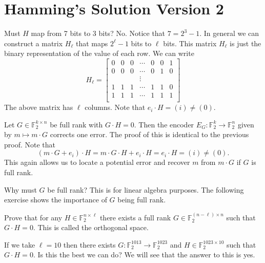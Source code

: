 \documentclass[10pt]{article}
\begin{document}
\section{Hamming's Solution Version 2}
Must $H$ map from 7 bits to 3 bits? No. Notice that $7 = 2^3-1.$ In general we can construct a matrix $H_\ell$ that maps $2^{\ell}-1$ bits to $\ell$ bits. This matrix $H_\ell$ is just the binary representation of the value of each row. We can write
\begin{equation}
H_\ell = \left[\begin{array}{ccccccc}
0 & 0 & 0  & \cdots & 0 & 0 & 1 \\
0 & 0 & 0 & \cdots & 0 & 1 & 0 \\
&&&\vdots&&& \\
1 & 1 & 1 & \cdots & 1 & 1 & 0 \\
1 & 1 & 1 & \cdots & 1 & 1 & 1 \\
\end{array}\right]
\end{equation}
The above matrix has $\ell$ columns. Note that $e_i \cdot H = (i) \neq (0).$ 

Let $G \in \mathbb F_2^{k \times n}$ be full rank with $G \cdot H = 0$. Then the encoder $E_G: \mathbb F_2^k \rightarrow \mathbb F_2^n$ given by $m \mapsto m\cdot G$ corrects one error. The proof of this is identical to the previous proof. Note that $$(m\cdot G + e_i) \cdot H = m\cdot G \cdot H + e_i \cdot H = e_i \cdot H = (i) \neq (0).$$ This again allows us to locate a potential error and recover $m$ from $m \cdot G$ if $G$ is full rank.

Why must $G$ be full rank? This is for linear algebra purposes. The following exercise shows the importance of $G$ being full rank.
\begin{exercise}
Prove that for any $H \in \mathbb F_2^{n \times \ell}$ there exists a full rank $G \in \mathbb F_2^{(n-\ell)\times n}$ such that $G \cdot H = 0$. This is called the orthogonal space.
\end{exercise}

If we take $\ell = 10$ then there exists $G: \mathbb F_2^{1013} \rightarrow \mathbb F_2^{1023}$ and $H \in \mathbb F_2^{1023 \times 10}$ such that $G \cdot H = 0.$ Is this the best we can do? We will see that the answer to this is yes.
\end{document}
